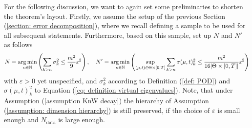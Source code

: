 For the following discussion, we want to again set some preliminaries to shorten the theorem's layout.
Firstly, we assume the setup of the previous Section (\ref{section: error decomposition}), where we recall
defining a sample to be used for all subsequent statements. Furthermore, based on this sample,
set up $N$ and $N'$ as follows
\begin{equation} \label{eq: definition of N, N'}
    N = \underset{n \in \mathbb{N}}{\operatorname{arg \, min}} \left( \sum_{k > n} \sigma_k^2 \leq \frac{m^2}{9} \varepsilon^2 \right),
    \quad N' = \underset{n \in \mathbb{N}}{\operatorname{arg \, min}} \left( \sup\limits_{(\mu, t) \in \Theta \times [0, T]} 
    \sum_{k > n} \sigma(\mu, t)_k^2 \leq \frac{m^2}{16 \lvert \Theta \times [0, T] \rvert} 
    \varepsilon^2 \right)
\end{equation}
with $\varepsilon > 0$ yet unspecified, and $\sigma_k^2$ according to 
Definition (\ref{def: POD}) and $\sigma(\mu, t)_k^2$ to
Equation (\ref{eq: definition virtual eigenvalues}). Note, that under Assumption (\ref{assumption KnW decay}) the hierarchy
of Assumption (\ref{assumption: dimension hierarchy}) is still preserved, if the choice of $\varepsilon$ is small
enough and $N_\text{data}$ is large enough.

